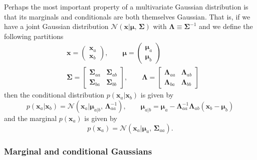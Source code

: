 Perhaps the most important property of a multivariate Gaussian distribution is that its marginals and conditionals are both themselves Gaussian. That is, if we have a joint Gaussian distribution $\mathcal{N}(\mathbf{x}|\boldsymbol{\mu},\, \boldsymbol{\Sigma})$ with $\boldsymbol{\Lambda} \equiv \boldsymbol{\Sigma}^{-1}$ and we define the following partitions
\begin{align}
	& \mathbf{x} =
	\begin{pmatrix}
		\mathbf{x}_a \\
		\mathbf{x}_b
	\end{pmatrix},
	\qquad
	\boldsymbol{\mu} =
	\begin{pmatrix}
		\boldsymbol{\mu}_a \\
		\boldsymbol{\mu}_b
	\end{pmatrix}
	\\
	& \boldsymbol{\Sigma} =
	\begin{bmatrix}
		\boldsymbol{\Sigma}_{aa} & \boldsymbol{\Sigma}_{ab} \\
		\boldsymbol{\Sigma}_{ba} & \boldsymbol{\Sigma}_{bb}
	\end{bmatrix},
	\qquad
	\boldsymbol{\Lambda} =
	\begin{bmatrix}
		\boldsymbol{\Lambda}_{aa} & \boldsymbol{\Lambda}_{ab} \\
		\boldsymbol{\Lambda}_{ba} & \boldsymbol{\Lambda}_{bb}
	\end{bmatrix}	
\end{align}
then the conditional distribution $p(\mathbf{x}_a|\mathbf{x}_b)$ is given by
\begin{equation}
	p(\mathbf{x}_a|\mathbf{x}_b)
	= \mathcal{N}(\mathbf{x}_a|\boldsymbol{\mu}_{a|b},\, \boldsymbol{\Lambda}_{aa}^{-1}),
	\qquad
	\boldsymbol{\mu}_{a|b}
	= \boldsymbol{\mu}_{a} - \boldsymbol{\Lambda}_{aa}^{-1}\boldsymbol{\Lambda}_{ab}(\mathbf{x}_b - \boldsymbol{\mu}_{b})
\end{equation}
and the marginal $p(\mathbf{x}_a)$ is given by
\begin{equation}
	p(\mathbf{x}_a)
	= \mathcal{N}(\mathbf{x}_a|\boldsymbol{\mu}_{a},\, \boldsymbol{\Sigma}_{aa}).
\end{equation}

\subsubsection{Marginal and conditional Gaussians}

